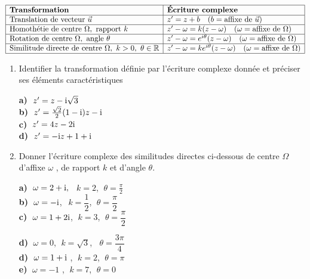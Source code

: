 $$
\begin{array}{|l|l|}
\hline
\textbf{Transformation} & \textbf{Écriture complexe} \\
\hline
\text{Translation de vecteur } \vec{u} & z' = z + b \quad (b = \text{affixe de } \vec{u}) \\
\hline
\text{Homothétie de centre } \Omega,\ \text{rapport } k & z' - \omega = k(z - \omega) \quad (\omega = \text{affixe de } \Omega) \\
\hline
\text{Rotation de centre } \Omega,\ \text{angle } \theta & z' - \omega = e^{i\theta}(z - \omega) \quad (\omega = \text{affixe de } \Omega) \\
\hline
\text{Similitude directe de centre } \Omega,\ k > 0,\ \theta\in\mathbb{R} & z' - \omega = ke^{i\theta}(z - \omega) \quad (\omega = \text{affixe de } \Omega) \\
\hline
\end{array}
$$
\begin{exercice}
\begin{enumerate}
\item Identifier la transformation définie par l'écriture complexe donnée et préciser ses éléments
caractéristiques

\medskip

\textbf{a)} $\; z'=z-\text{i}\sqrt{3} $ \\
\textbf{b)} $\; z'=\tfrac{\sqrt{2}}{2}(1-\text{i})z-\text{i} $\\ \textbf{c)} $\; z'=4 z- 2\text{i} $ \\ 
\textbf{d)} $ \; z'=-\text{i} z+1+\text{i} $
\item Donner l'écriture complexe des similitudes directes ci-dessous de centre $ \Omega $ d'affixe $ \omega $ , de rapport $ k $ et
d'angle $ \theta $.

\medskip

\textbf{a)} $\; \omega=2+\text{i},\; $ $\; k= 2$,  $\; \theta= \frac{\pi}{2}$\\
\textbf{b)}  $ \;\omega=-\text{i} $,\ $ \;k= \dfrac{1}{2}$,  $\; \theta= \dfrac{\pi}{2}$ \\
\textbf{c)}  $\; \omega= 1+2\text{i} $,  $ \;k= 3$,   $\; \theta= \dfrac{\pi}{2}$  

\textbf{d)}  $\; \omega=0$,  $\; k= \sqrt{3}$, $\;\; \theta= \dfrac{3\pi}{4}$ \\
\textbf{d)}  $ \;\omega= 1+\text{i} $ ,  $ \;k= 2$,  $\; \theta=\pi$  \\
\textbf{e)}  $\; \omega= -1 $ ,  $ \;k= 7$,  $\; \theta= 0$  
\end{enumerate}
 \end{exercice}
